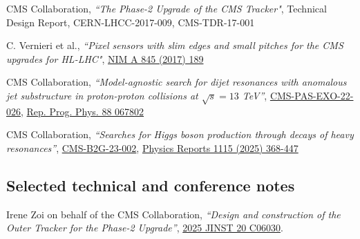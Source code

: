      
             \begin{refsection}
      \vspace{2mm}
      \onehalfspacing
  CMS Collaboration, {\sl ``The Phase-2 Upgrade of the CMS Tracker"}, Technical Design Report, CERN-LHCC-2017-009, CMS-TDR-17-001
 \end{refsection}
 
         \begin{refsection}
      \vspace{2mm}
      \onehalfspacing

 C. Vernieri et al., {\sl ``Pixel sensors with slim edges and small pitches for the CMS upgrades for HL-LHC"}, \href{http://dx.doi.org/10.1016/j.nima.2016.06.020}{NIM A 845 (2017) 189}

 \end{refsection}

\begin{refsection}
      \vspace{2mm}
      \onehalfspacing
CMS Collaboration, {\sl ``Model-agnostic search for dijet resonances with anomalous jet substructure in proton-proton collisions at $\sqrt{s}=13$ TeV''},
\href{https://cds.cern.ch/record/2892677?ln=en}{CMS-PAS-EXO-22-026},
\href{https://iopscience.iop.org/article/10.1088/1361-6633/add762}{Rep. Prog. Phys. 88 067802}
    \end{refsection}  
  
\begin{refsection}
      \vspace{2mm}
      \onehalfspacing
CMS Collaboration, {\sl ``Searches for Higgs boson production through decays of heavy resonances''},
\href{https://cds.cern.ch/record/2892661}{CMS-B2G-23-002},
\href{https://www.sciencedirect.com/journal/physics-reports/vol/1115/}{Physics Reports 1115 (2025) 368-447}
    \end{refsection}



\subsection{Selected technical and conference notes}

\begin{refsection}
      \vspace{2mm}
      \onehalfspacing
Irene Zoi on behalf of the CMS Collaboration, {\sl ``Design and construction of the Outer Tracker for the Phase-2 Upgrade''},
\href{https://doi.org/10.1088/1748-0221/20/06/C06030}{2025 JINST 20 C06030}.
    \end{refsection}

